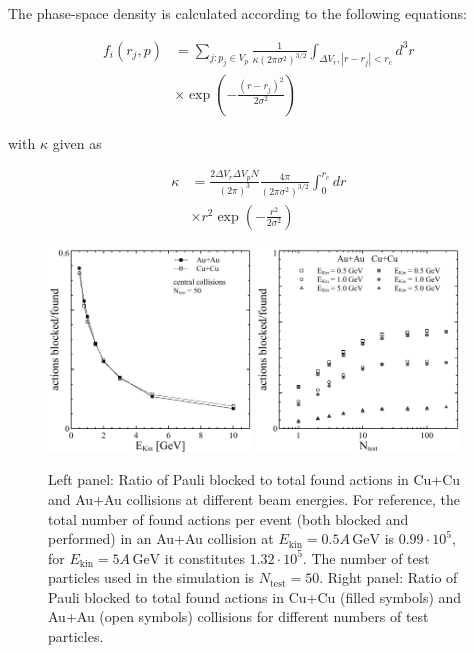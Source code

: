 The phase-space density is calculated according to the following equations:

\begin{align}
  f_i (r_j,p) &= \sum_{j: p_j \in V_p} \frac{1}{\kappa (2 \pi \sigma^2)^{3/2}}
            \int_{\Delta V_r, |r - r_j| < r_c} d^3r \, \nonumber\\
            &\times \exp \left( - \frac{(r-r_j)^2}{2 \sigma^2} \right)
\end{align}

with $\kappa$ given as

\begin{align}
  \kappa &= \frac{2 \Delta V_r \Delta V_p N}{(2 \pi)^3} \frac{4 \pi}{(2 \pi \sigma^2)^{3/2}}
        \int_0^{r_c} dr \, \nonumber\\
       &\times r^2 \exp \left(- \frac{r^2}{2 \sigma^2}\right)
\end{align}

\begin{figure}
  \centering
  \includegraphics[width=0.48\textwidth]{plots/smash/PB_ekin.pdf}
  \includegraphics[width=0.48\textwidth]{plots/smash/PB_ntest.pdf}

  \caption{Left panel: Ratio of Pauli blocked to total found actions in Cu+Cu and Au+Au
           collisions at different beam energies. For reference, the total number of found
           actions per event (both blocked and performed) in an Au+Au collision at
           $E_\text{kin} = 0.5A\,\text{GeV}$ is $0.99 \cdot 10^5$, for $E_\text{kin} =
           5A\,\text{GeV}$ it constitutes $1.32 \cdot 10^5$. The number of test particles
           used in the simulation is $N_\text{test} = 50$.
           Right panel: Ratio of Pauli blocked to total found actions in Cu+Cu (filled
           symbols) and Au+Au (open symbols) collisions for different numbers of test
           particles.}
  \label{fig:pauli_blocking}
\end{figure}

